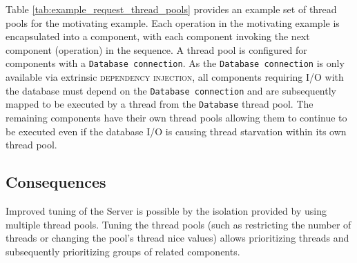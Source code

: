 \documentclass[prodmode]{style/acmlarge}
\begin{document}
Table \ref{tab:example_request_thread_pools} provides an example set of thread
pools for the motivating example.  Each operation in the motivating example is
encapsulated into a component, with each component invoking the next component
(operation) in the sequence.  A thread pool is configured for components with a
\texttt{Database connection}.  As the \texttt{Database connection} is only
available via extrinsic \textsc{dependency injection}, all components requiring
I/O with the database must depend on the \texttt{Database connection} and are
subsequently mapped to be executed by a thread from the \texttt{Database} thread
pool.  The remaining components have their own thread pools allowing them to
continue to be executed even if the database I/O is causing thread starvation
within its own thread pool.

\begin{table}[t]
\label{tab:example_request_thread_pools}
\end{table}


\subsection{Consequences}

Improved tuning of the Server is possible by the isolation provided by using
multiple thread pools.  Tuning the thread pools (such as restricting the number
of threads or changing the pool's thread nice values) allows prioritizing
threads and subsequently prioritizing groups of related components.
\end{document}

